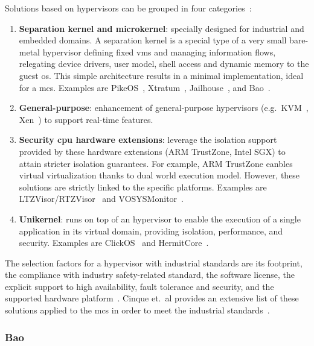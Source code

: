 Solutions based on hypervisors can be grouped in four categories~\cite{cinque2022virtualizing}:
\begin{enumerate}
\item \textbf{Separation kernel and microkernel}: specially designed for
  industrial and embedded domains. A separation kernel is a special type of a
  very small bare-metal hypervisor defining fixed \glspl{vm} and managing
  information flows, relegating device drivers, user model, shell access and
  dynamic memory to the guest \gls{os}. This simple architecture results in a
  minimal implementation, ideal for a \gls{mcs}. Examples are PikeOS~\cite{pikeOS}, Xtratum~\cite{masmano2009xtratum},
  Jailhouse~\cite{jailhouse}, and Bao~\cite{martins_et_al:OASIcs:2020:11779}.
\item \textbf{General-purpose}: enhancement of general-purpose hypervisors
  (e.g.~KVM~\cite{kivity2007kvm}, Xen~\cite{barham2003xen}) to
  support real-time features.
\item \textbf{Security \gls{cpu} hardware extensions}: leverage the isolation
  support provided by these hardware extensions (ARM TrustZone, Intel SGX) to attain stricter isolation
  guarantees. For example, ARM TrustZone eanbles virtual virtualization thanks
  to dual world execution model. However, these solutions are strictly linked to the specific
  platforms. Examples are LTZVisor/RTZVisor~\cite{pinto2016towards,rtzvisor} and VOSYSMonitor~\cite{lucas2017vosysmonitor,lucas_vosysmonitor_2018}.%
\item \textbf{Unikernel}: runs on top of an hypervisor to enable the execution
  of a single application in its virtual domain, providing isolation,
  performance, and security. Examples are ClickOS~\cite{martins2014clickos} and HermitCore~\cite{lankes2016hermitcore}.
\end{enumerate}

The selection factors for a hypervisor with industrial standards are its footprint, the compliance with
industry safety-related standard, the software license, the explicit support to
high availability, fault tolerance and security, and the supported hardware
platform~\cite{cinque2022virtualizing}. Cinque et.~al provides an extensive list
of these solutions applied to the \gls{mcs} in order to meet the industrial standards~\cite{cinque2022virtualizing}.

\subsubsection{Bao}%
\label{sec:bao}


